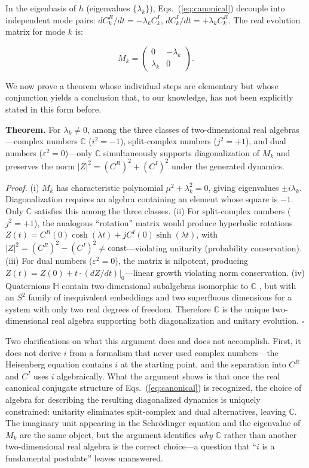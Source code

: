 \documentclass[aps,prd,reprint,superscriptaddress,twocolumn]{revtex4-2}
\begin{document}
In the eigenbasis of $h$ (eigenvalues $\{\lambda_k\}$), Eqs.~(\ref{eq:canonical}) decouple into independent mode pairs: $dC^R_k/dt = -\lambda_k C^I_k$, $dC^I_k/dt = +\lambda_k C^R_k$. The real evolution matrix for mode $k$ is:

\begin{equation}
M_k = \begin{pmatrix} 0 & -\lambda_k \\ \lambda_k & 0 \end{pmatrix}.
\end{equation}

We now prove a theorem whose individual steps are elementary but whose conjunction yields a conclusion that, to our knowledge, has not been explicitly stated in this form before.

\textbf{Theorem.} For $\lambda_k \neq 0$, among the three classes of two-dimensional real algebras---complex numbers $\mathbb{C}$ ($i^2=-1$), split-complex numbers ($j^2=+1$), and dual numbers ($\varepsilon^2=0$)---only $\mathbb{C}$ simultaneously supports diagonalization of $M_k$ and preserves the norm $|Z|^2 = (C^R)^2 + (C^I)^2$ under the generated dynamics.

\textit{Proof.} (i) $M_k$ has characteristic polynomial $\mu^2 + \lambda_k^2 = 0$, giving eigenvalues $\pm i\lambda_k$. Diagonalization requires an algebra containing an element whose square is $-1$. Only $\mathbb{C}$ satisfies this among the three classes. (ii) For split-complex numbers ($j^2=+1$), the analogous ``rotation'' matrix would produce hyperbolic rotations $Z(t) = C^R(0)\cosh(\lambda t) + j C^I(0)\sinh(\lambda t)$, with $|Z|^2 = (C^R)^2 - (C^I)^2 \neq \text{const}$---violating unitarity (probability conservation). (iii) For dual numbers ($\varepsilon^2=0$), the matrix is nilpotent, producing $Z(t) = Z(0) + t \cdot (dZ/dt)|_0$---linear growth violating norm conservation. (iv) Quaternions $\mathbb{H}$ contain two-dimensional subalgebras isomorphic to $\mathbb{C}$ \cite{KuzminaChodorova2016}, but with an $S^2$ family of inequivalent embeddings and two superfluous dimensions for a system with only two real degrees of freedom. Therefore $\mathbb{C}$ is the unique two-dimensional real algebra supporting both diagonalization and unitary evolution. $\square$

Two clarifications on what this argument does and does not accomplish. First, it does not derive $i$ from a formalism that never used complex numbers---the Heisenberg equation contains $i$ at the starting point, and the separation into $C^R$ and $C^I$ uses $i$ algebraically. What the argument shows is that once the real canonical conjugate structure of Eqs.~(\ref{eq:canonical}) is recognized, the choice of algebra for describing the resulting diagonalized dynamics is uniquely constrained: unitarity eliminates split-complex and dual alternatives, leaving $\mathbb{C}$. The imaginary unit appearing in the Schr\"{o}dinger equation and the eigenvalue of $M_k$ are the same object, but the argument identifies \textit{why} $\mathbb{C}$ rather than another two-dimensional real algebra is the correct choice---a question that ``$i$ is a fundamental postulate'' leaves unanswered.
\end{document}
